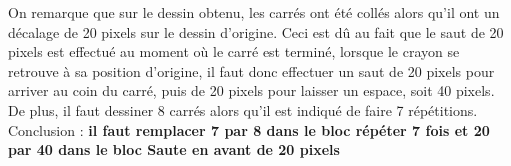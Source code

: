 On remarque que sur le dessin obtenu, les carrés ont été collés alors qu'il ont un décalage de 20 pixels sur le dessin d'origine. Ceci est dû au fait que le saut de 20 pixels est effectué au moment où le carré est terminé, lorsque le crayon se retrouve à sa position d'origine, il faut donc effectuer un saut de 20 pixels pour arriver au coin du carré, puis de 20 pixels pour laisser un espace, soit 40 pixels. \\
De plus, il faut dessiner 8 carrés alors qu'il est indiqué de faire 7 répétitions. \\
Conclusion : {\bf il faut remplacer 7 par 8 dans le bloc \og répéter 7 fois \fg{} et 20 par 40 dans le bloc \og Saute en avant de 20 pixels \fg}
